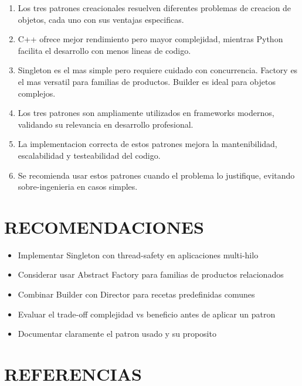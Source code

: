 \documentclass[11pt,a4paper]{article}
\begin{document}
\begin{enumerate}
    \item Los tres patrones creacionales resuelven diferentes problemas de creacion de objetos, cada uno con sus ventajas especificas.
    
    \item C++ ofrece mejor rendimiento pero mayor complejidad, mientras Python facilita el desarrollo con menos lineas de codigo.
    
    \item Singleton es el mas simple pero requiere cuidado con concurrencia. Factory es el mas versatil para familias de productos. Builder es ideal para objetos complejos.
    
    \item Los tres patrones son ampliamente utilizados en frameworks modernos, validando su relevancia en desarrollo profesional.
    
    \item La implementacion correcta de estos patrones mejora la mantenibilidad, escalabilidad y testeabilidad del codigo.
    
    \item Se recomienda usar estos patrones cuando el problema lo justifique, evitando sobre-ingenieria en casos simples.
\end{enumerate}

\section{RECOMENDACIONES}

\begin{itemize}
    \item Implementar Singleton con thread-safety en aplicaciones multi-hilo
    \item Considerar usar Abstract Factory para familias de productos relacionados
    \item Combinar Builder con Director para recetas predefinidas comunes
    \item Evaluar el trade-off complejidad vs beneficio antes de aplicar un patron
    \item Documentar claramente el patron usado y su proposito
\end{itemize}

\section{REFERENCIAS}
\end{document}
